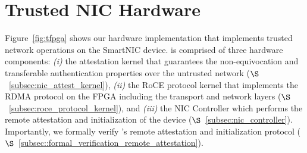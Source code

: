 \section{Trusted NIC Hardware}
\label{sec:t-nic-hardware}

Figure~\ref{fig:tfpga} shows our \projecttitle{} hardware implementation that implements trusted network operations on the SmartNIC device. \projecttitle{} is comprised of three hardware components: \emph{(i)} the attestation kernel that guarantees the non-equivocation and transferable authentication properties over the untrusted network ($\S$~\ref{subsec:nic_attest_kernel}), \emph{(ii)} the RoCE protocol kernel that implements the RDMA protocol on the FPGA including the transport and network layers ($\S$~\ref{subsec:roce_protocol_kernel}),  and \emph{(iii)} the NIC Controller which performs the remote attestation and initialization of the device ($\S$~\ref{subsec:nic_controller}). Importantly, we formally verify \projecttitle{}'s remote attestation and initialization protocol ($\S$~\ref{subsec::formal_verification_remote_attestation}).






